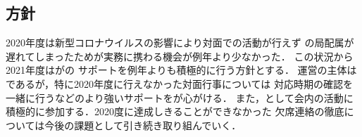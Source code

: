 \subsection*{\newGradeIfKouki{}\thirdGrade{}方針}


2020年度は新型コロナウイルスの影響により対面での活動が行えず
\firstGrade{}の局配属が遅れてしまったため\firstGrade{}が実務に携わる機会が例年より少なかった．
この状況から2021年度は\newGradeIfKouki{}\thirdGrade{}が\newGradeIfKouki{}\secondGrade{}の
サポートを例年よりも積極的に行う方針とする．
運営の主体は\newGradeIfKouki{}\secondGrade{}であるが，特に2020年度に行えなかった対面行事については
対応時期の確認を一緒に行うなどのより強いサポートを\newGradeIfKouki{}\thirdGrade{}が心がける．
また，\newGradeIfKouki{}\thirdGrade{}として会内の活動に積極的に参加する．2020度に達成しきることができなかった
欠席連絡の徹底については今後の課題として引き続き取り組んでいく．


